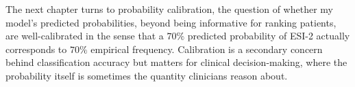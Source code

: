 The next chapter turns to probability calibration, the question of whether my model's predicted probabilities, beyond being informative for ranking patients, are well-calibrated in the sense that a $70\%$ predicted probability of ESI-2 actually corresponds to $70\%$ empirical frequency. Calibration is a secondary concern behind classification accuracy but matters for clinical decision-making, where the probability itself is sometimes the quantity clinicians reason about.
